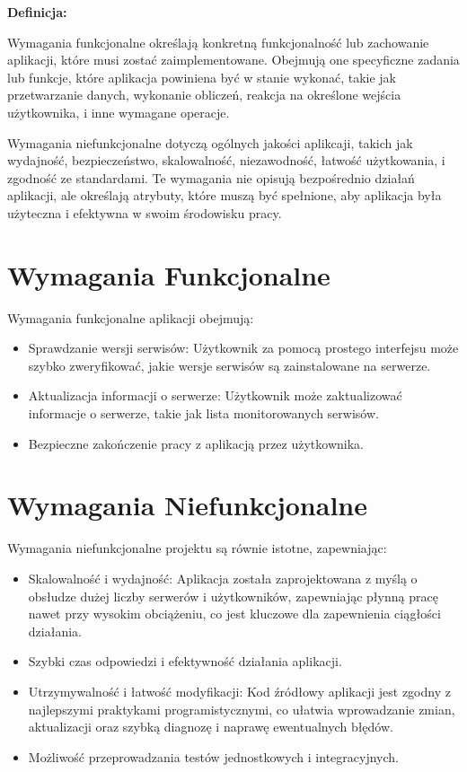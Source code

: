 \noindent \textbf{Definicja:}

Wymagania funkcjonalne określają konkretną funkcjonalność lub zachowanie aplikacji, które musi zostać zaimplementowane. Obejmują one specyficzne zadania lub funkcje, które aplikacja powiniena być w stanie wykonać, takie jak przetwarzanie danych, wykonanie obliczeń, reakcja na określone wejścia użytkownika, i inne wymagane operacje.

Wymagania niefunkcjonalne dotyczą ogólnych jakości aplikcaji, takich jak wydajność, bezpieczeństwo, skalowalność, niezawodność, łatwość użytkowania, i zgodność ze standardami. Te wymagania nie opisują bezpośrednio działań aplikacji, ale określają atrybuty, które muszą być spełnione, aby aplikacja była użyteczna i efektywna w swoim środowisku pracy.

\section{Wymagania Funkcjonalne}

Wymagania funkcjonalne aplikacji obejmują:

\begin{itemize}
\item Sprawdzanie wersji serwisów: Użytkownik za pomocą prostego interfejsu może szybko zweryfikować, jakie wersje serwisów są zainstalowane na serwerze.
\item Aktualizacja informacji o serwerze: Użytkownik może zaktualizować informacje o serwerze, takie jak lista monitorowanych serwisów.
\item Bezpieczne zakończenie pracy z aplikacją przez użytkownika.
\end{itemize}

\section{Wymagania Niefunkcjonalne}

Wymagania niefunkcjonalne projektu są równie istotne, zapewniając:

\begin{itemize}
\item Skalowalność i wydajność: Aplikacja została zaprojektowana z myślą o obsłudze dużej liczby serwerów i użytkowników, zapewniając płynną pracę nawet przy wysokim obciążeniu, co jest kluczowe dla zapewnienia ciągłości działania.
\item Szybki czas odpowiedzi i efektywność działania aplikacji.
\item Utrzymywalność i łatwość modyfikacji: Kod źródłowy aplikacji jest zgodny z najlepszymi praktykami programistycznymi, co ułatwia wprowadzanie zmian, aktualizacji oraz szybką diagnozę i naprawę ewentualnych błędów.
\item Możliwość przeprowadzania testów jednostkowych i integracyjnych.
\end{itemize}

